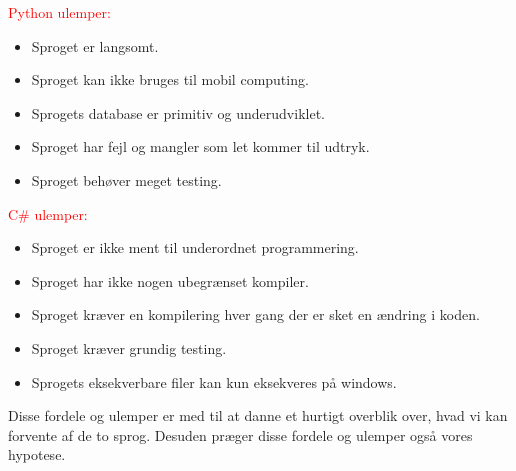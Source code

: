 \documentclass[class=report, crop=false]{standalone}
\begin{document}
        \begin{multicols}{2}
        \raggedcolumns
        \begin{tcolorbox}
        \noindent\textcolor{red}{Python ulemper:}
        \begin{itemize}
            \setlength{\itemsep}{0pt}
            \setlength{\parskip}{0pt}
            \item Sproget er langsomt.
            \item Sproget kan ikke bruges til mobil computing.
            \item Sprogets database er primitiv og underudviklet.
            \item Sproget har fejl og mangler som let kommer til udtryk.
            \item Sproget behøver meget testing.
        \end{itemize}
        \vspace*{4pt}
        \end{tcolorbox}
        \columnbreak

        \begin{tcolorbox}
        \noindent\textcolor{red}{C\# ulemper:}
        \begin{itemize}
            \setlength{\itemsep}{0pt}
            \setlength{\parskip}{0pt}
            \item Sproget er ikke ment til underordnet programmering.
            \item Sproget har ikke nogen ubegrænset kompiler.
            \item Sproget kræver en kompilering hver gang der er sket en ændring i koden.
            \item Sproget kræver grundig testing.
            \item Sprogets eksekverbare filer kan kun eksekveres på windows.
        \end{itemize}
        \end{tcolorbox}
        \end{multicols}
        \noindent Disse fordele og ulemper er med til at danne et hurtigt overblik over, hvad vi kan forvente af de to sprog. Desuden præger disse fordele og ulemper også vores hypotese.
\end{document}
